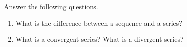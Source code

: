 \begin{exercise}
	Answer the following questions.
	\renewcommand{\labelenumi}{(\alph{enumi})}
	\begin{enumerate}
		\item What is the difference between a sequence and a series?
		\item What is a convergent series? What is a divergent series?
	\end{enumerate}
\end{exercise}
